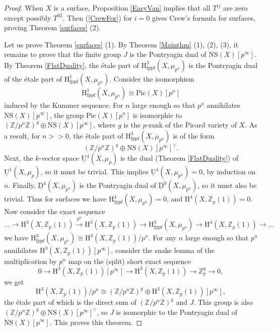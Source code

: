 \documentclass[a4paper,12pt,twoside]{report}
\newcommand{\Z}{\mathbb{Z}}
\newcommand{\uU}{\underline{\mathrm{U}}}
\newcommand{\uD}{\underline{\mathrm{D}}}
\newcommand{\fppf}{\mathrm{fppf}}
\newcommand{\Pic}{\mathrm{Pic}}
\newcommand{\NS}{\mathrm{NS}}
\newcommand{\HH}{\mathrm{H}}
\begin{document}
\begin{proof}
When $X$ is a surface, Proposition \ref{EasyVan} implies that all $T^{ij}$ are zero except
possibly $T^{02}$. Then
(\ref{CrewFor}) for $i=0$ gives Crew's formula for surfaces, proving
Theorem \ref{surfaces} (2). 

Let us prove Theorem \ref{surfaces} (1). By Theorem \ref{Mainthm} (1), (2), (3), 
it remains to prove that the finite group $J$ is the Pontryagin dual of $\NS(X)[p^{\infty}]$. 
By Theorem \ref{FlatDuality}, the \'etale part of $\HH^3_{\fppf}(X,\mu_{p^n})$ is the Pontryagin dual of the \'etale part of $\HH^1_{\fppf}(X,\mu_{p^n})$. 
Consider the isomorphism 
\[\HH^1_{\fppf}(X,\mu_{p^n})\cong \Pic(X)[p^n]\]
induced by the Kummer sequence. For  $n$ large enough so that $p^n$ annihilates $\NS(X)[p^\infty]$, 
the group $\Pic(X)[p^n]$ is isomorphic to 
$(\Z/p^n\Z)^g\oplus \NS(X)[p^{\infty}]$, 
where $g$ is the $p$-rank of the Picard variety of $X$. 
As a result, for $n>> 0$, the \'etale part of $\HH^3_{\fppf}(X,\mu_{p^n})$ is of the form 
\[(\Z/p^n\Z)^g\oplus \NS(X)[p^{\infty}]^{\vee}.\]
Next, the $k$-vector space $\uU^4(X,\mu_{p})$ is the dual (Theorem \ref{FlatDuality}) of $\uU^1(X,\mu_{p})$, 
so it must be trivial. This implies $\uU^4(X,\mu_{p^n})=0$, by induction on $n$.
Finally, $\uD^4(X,\mu_{p^n})$ is the Pontryagin dual of $\uD^0(X,\mu_{p^n})$, 
so it must also be trivial. 
Thus for surfaces we have $\HH^4_{\fppf}(X,\mu_{p^n})=0$, and $\HH^4(X,\Z_p(1))=0$. 
Now consider the exact sequence 
\[...\rightarrow \HH^3(X,\Z_p(1))\xrightarrow{p^n}\HH^3(X,\Z_p(1))\rightarrow \HH^3_{\fppf}(X,\mu_{p^n})\rightarrow \HH^4(X,\Z_p(1))\rightarrow ...\]
we have
$\HH^3_{\fppf}(X,\mu_{p^n})\cong\HH^3(X,\Z_p(1))/p^n$. 
For any $n$ large enough so that $p^n$ annihilates $\HH^3(X,\Z_p(1))[p^{\infty}]$, 
consider the snake lemma of the multiplication by $p^n$ map on the (split) short exact sequence 
\[0\rightarrow \HH^3(X,\Z_p(1))[p^\infty]\rightarrow \HH^3(X,\Z_p(1))\rightarrow \Z_p^g\rightarrow 0,\]
we get \[ \HH^3(X,\Z_p(1))/p^n\cong (\Z/p^n\Z)^{g}\oplus \HH^3(X,\Z_p(1))[p^{\infty}],\]  
the \'etale part of which is the direct sum of $(\Z/p^n\Z)^{g}$ and $J$. 
This group is also $(\Z/p^n\Z)^{g}\oplus \NS(X)[p^\infty]^\vee$, so $J$ is isomorphic to the Pontryagin dual of $\NS(X)[p^{\infty}]$. This proves this theorem. 
\end{proof}
\end{document}
